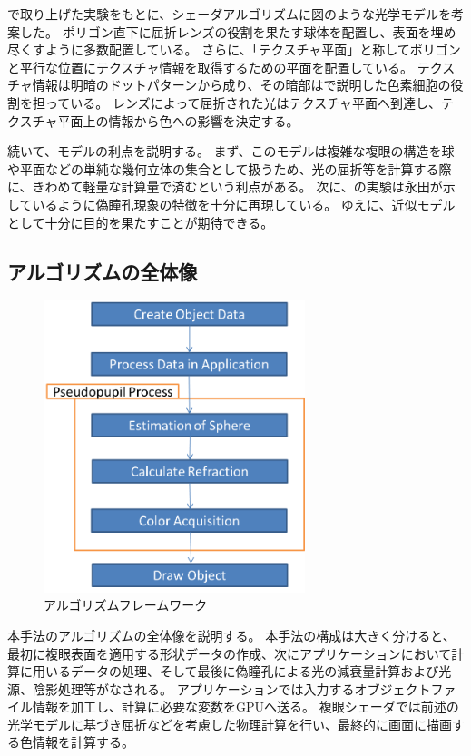 で取り上げた実験をもとに、シェーダアルゴリズムに図のような光学モデルを考案した。
ポリゴン直下に屈折レンズの役割を果たす球体を配置し、表面を埋め尽くすように多数配置している。
さらに、「テクスチャ平面」と称してポリゴンと平行な位置にテクスチャ情報を取得するための平面を配置している。
テクスチャ情報は明暗のドットパターンから成り、その暗部はで説明した色素細胞の役割を担っている。
レンズによって屈折された光はテクスチャ平面へ到達し、テクスチャ平面上の情報から色への影響を決定する。

続いて、モデルの利点を説明する。
まず、このモデルは複雑な複眼の構造を球や平面などの単純な幾何立体の集合として扱うため、光の屈折等を計算する際に、きわめて軽量な計算量で済むという利点がある。
次に、の実験は永田\cite{nagata-2008-03-10}が示しているように偽瞳孔現象の特徴を十分に再現している。
ゆえに、近似モデルとして十分に目的を果たすことが期待できる。


\subsection{アルゴリズムの全体像}
\label{SSAlgorithm}

\begin{figure}[h]
  \centering
  \includegraphics[width=3.0in]{./img/graph/algo_framework.png}
  \caption{アルゴリズムフレームワーク}
  \label{FAlgoframework}
\end{figure}

本手法のアルゴリズムの全体像を説明する。
本手法の構成は大きく分けると、最初に複眼表面を適用する形状データの作成、次にアプリケーションにおいて計算に用いるデータの処理、そして最後に偽瞳孔による光の減衰量計算および光源、陰影処理等がなされる。
アプリケーションでは入力するオブジェクトファイル情報を加工し、計算に必要な変数をGPUへ送る。
複眼シェーダでは前述の光学モデルに基づき屈折などを考慮した物理計算を行い、最終的に画面に描画する色情報を計算する。

